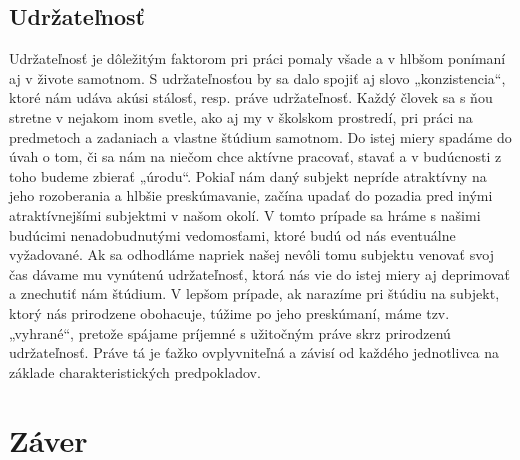 \documentclass[10pt,twoside,slovak,a4paper]{article}
\begin{document}
\subsection{Udržateľnosť} \label{ina:udrzatelnost}
Udržateľnosť je dôležitým faktorom pri práci pomaly všade a v hlbšom ponímaní aj v živote samotnom. S udržateľnosťou by sa dalo spojiť aj slovo „konzistencia“, ktoré nám udáva akúsi stálosť, resp. práve udržateľnosť. Každý človek sa s ňou stretne v nejakom inom svetle, ako aj my v školskom prostredí, pri práci na predmetoch a zadaniach a vlastne štúdium samotnom. Do istej miery spadáme do úvah o tom, či sa nám na niečom chce aktívne pracovať, stavať a v budúcnosti z toho budeme zbierať „úrodu“. 
Pokiaľ nám daný subjekt nepríde atraktívny na jeho rozoberania a hlbšie preskúmavanie, začína upadať do pozadia pred inými atraktívnejšími subjektmi v našom okolí. V tomto prípade sa hráme s našimi budúcimi nenadobudnutými vedomosťami, ktoré budú od nás eventuálne vyžadované. Ak sa odhodláme napriek našej nevôli tomu subjektu venovať svoj čas dávame mu vynútenú udržateľnosť, ktorá nás vie do istej miery aj deprimovať a znechutiť nám štúdium. 
V lepšom prípade, ak narazíme pri štúdiu na subjekt, ktorý nás prirodzene obohacuje, túžime po jeho preskúmaní, máme tzv. „vyhrané“, pretože spájame príjemné s užitočným práve skrz prirodzenú udržateľnosť. Práve tá je ťažko ovplyvniteľná a závisí od každého jednotlivca na základe charakteristických predpokladov.


\section{Záver} \label{zaver} %






\end{document}
